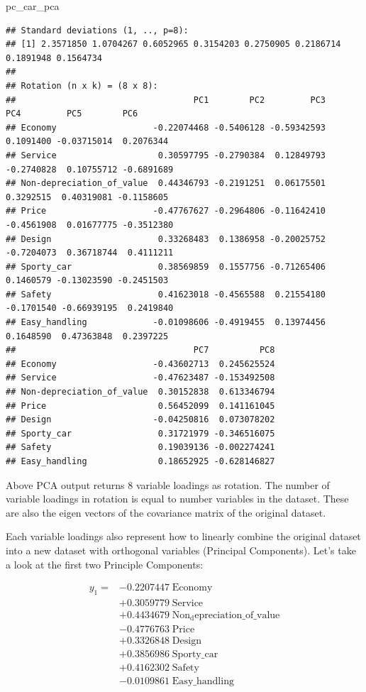 \documentclass[]{article}
\newenvironment{Shaded}{\begin{snugshade}}{\end{snugshade}}
\newcommand{\NormalTok}[1]{#1}
\begin{document}
\begin{Shaded}
\begin{Highlighting}[]
\NormalTok{pc_car_pca}
\end{Highlighting}
\end{Shaded}

\begin{verbatim}
## Standard deviations (1, .., p=8):
## [1] 2.3571850 1.0704267 0.6052965 0.3154203 0.2750905 0.2186714 0.1891948 0.1564734
## 
## Rotation (n x k) = (8 x 8):
##                                   PC1        PC2         PC3        PC4         PC5        PC6
## Economy                   -0.22074468 -0.5406128 -0.59342593  0.1091400 -0.03715014  0.2076344
## Service                    0.30597795 -0.2790384  0.12849793 -0.2740828  0.10755712 -0.6891689
## Non-depreciation_of_value  0.44346793 -0.2191251  0.06175501  0.3292515  0.40319081 -0.1158605
## Price                     -0.47767627 -0.2964806 -0.11642410 -0.4561908  0.01677775 -0.3512380
## Design                     0.33268483  0.1386958 -0.20025752 -0.7204073  0.36718744  0.4111211
## Sporty_car                 0.38569859  0.1557756 -0.71265406  0.1460579 -0.13023590 -0.2451503
## Safety                     0.41623018 -0.4565588  0.21554180 -0.1701540 -0.66939195  0.2419840
## Easy_handling             -0.01098606 -0.4919455  0.13974456  0.1648590  0.47363848  0.2397225
##                                   PC7          PC8
## Economy                   -0.43602713  0.245625524
## Service                   -0.47623487 -0.153492508
## Non-depreciation_of_value  0.30152838  0.613346794
## Price                      0.56452099  0.141161045
## Design                    -0.04250816  0.073078202
## Sporty_car                 0.31721979 -0.346516075
## Safety                     0.19039136 -0.002274241
## Easy_handling              0.18652925 -0.628146827
\end{verbatim}

Above PCA output returns 8 variable loadings as rotation. The number of
variable loadings in rotation is equal to number variables in the
dataset. These are also the eigen vectors of the covariance matrix of
the original dataset.

Each variable loadings also represent how to linearly combine the
original dataset into a new dataset with orthogonal variables (Principal
Components). Let's take a look at the first two Principle Components:

\[
\begin{align*}
y_1 = 
    & -0.2207447\;  \mathrm{Economy} \\
    &+ 0.3059779\;  \mathrm{Service}    \\
    &+ 0.4434679\;  \mathrm{Non_depreciation\_of\_value} \\
    & -0.4776763\;  \mathrm{Price} \\
    &+ 0.3326848\;  \mathrm{Design}   \\
    &+ 0.3856986\;  \mathrm{Sporty\_car}  \\
    &+ 0.4162302\;  \mathrm{Safety}  \\
    & -0.0109861\;  \mathrm{Easy\_handling}  
\end{align*}
\]
\end{document}

